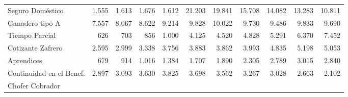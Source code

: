 \begin{tabular}{lllllllllll}
\multicolumn{1}{l}{\hspace{1em}Seguro Doméstico} &
  \multicolumn{1}{|r}{1.555} &
  \multicolumn{1}{r}{1.613} &
  \multicolumn{1}{r}{1.676} &
  \multicolumn{1}{r}{1.612} &
  \multicolumn{1}{r}{21.203} &
  \multicolumn{1}{r}{19.841} &
  \multicolumn{1}{r}{15.708} &
  \multicolumn{1}{r}{14.082} &
  \multicolumn{1}{r}{13.283} &
  \multicolumn{1}{r}{10.811} \\
\multicolumn{1}{l}{\hspace{1em}Ganadero tipo A} &
  \multicolumn{1}{|r}{7.557} &
  \multicolumn{1}{r}{8.067} &
  \multicolumn{1}{r}{8.622} &
  \multicolumn{1}{r}{9.214} &
  \multicolumn{1}{r}{9.828} &
  \multicolumn{1}{r}{10.022} &
  \multicolumn{1}{r}{9.730} &
  \multicolumn{1}{r}{9.486} &
  \multicolumn{1}{r}{9.833} &
  \multicolumn{1}{r}{9.690} \\
\multicolumn{1}{l}{\hspace{1em}Tiempo Parcial} &
  \multicolumn{1}{|r}{626} &
  \multicolumn{1}{r}{703} &
  \multicolumn{1}{r}{856} &
  \multicolumn{1}{r}{1.000} &
  \multicolumn{1}{r}{4.125} &
  \multicolumn{1}{r}{4.520} &
  \multicolumn{1}{r}{4.828} &
  \multicolumn{1}{r}{5.291} &
  \multicolumn{1}{r}{6.370} &
  \multicolumn{1}{r}{7.452} \\
\multicolumn{1}{l}{\hspace{1em}Cotizante Zafrero} &
  \multicolumn{1}{|r}{2.595} &
  \multicolumn{1}{r}{2.999} &
  \multicolumn{1}{r}{3.338} &
  \multicolumn{1}{r}{3.756} &
  \multicolumn{1}{r}{3.883} &
  \multicolumn{1}{r}{3.862} &
  \multicolumn{1}{r}{3.993} &
  \multicolumn{1}{r}{4.835} &
  \multicolumn{1}{r}{5.198} &
  \multicolumn{1}{r}{5.053} \\
\multicolumn{1}{l}{\hspace{1em}Aprendices} &
  \multicolumn{1}{|r}{679} &
  \multicolumn{1}{r}{914} &
  \multicolumn{1}{r}{1.016} &
  \multicolumn{1}{r}{1.384} &
  \multicolumn{1}{r}{1.707} &
  \multicolumn{1}{r}{1.890} &
  \multicolumn{1}{r}{2.305} &
  \multicolumn{1}{r}{2.789} &
  \multicolumn{1}{r}{3.015} &
  \multicolumn{1}{r}{2.840} \\
\multicolumn{1}{l}{\hspace{1em}Continuidad en el Benef.} &
  \multicolumn{1}{|r}{2.897} &
  \multicolumn{1}{r}{3.093} &
  \multicolumn{1}{r}{3.630} &
  \multicolumn{1}{r}{3.825} &
  \multicolumn{1}{r}{3.698} &
  \multicolumn{1}{r}{3.562} &
  \multicolumn{1}{r}{3.267} &
  \multicolumn{1}{r}{3.028} &
  \multicolumn{1}{r}{2.663} &
  \multicolumn{1}{r}{2.102} \\
\multicolumn{1}{l}{\hspace{1em}Chofer Cobrador} &

\end{tabular}
